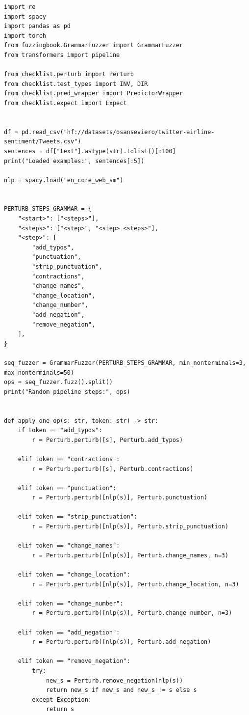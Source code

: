 \documentclass[11pt]{article}
\begin{document}
\lstset{style=mypython}
\begin{lstlisting}
import re
import spacy
import pandas as pd
import torch
from fuzzingbook.GrammarFuzzer import GrammarFuzzer
from transformers import pipeline

from checklist.perturb import Perturb
from checklist.test_types import INV, DIR
from checklist.pred_wrapper import PredictorWrapper
from checklist.expect import Expect


df = pd.read_csv("hf://datasets/osanseviero/twitter-airline-sentiment/Tweets.csv")
sentences = df["text"].astype(str).tolist()[:100]
print("Loaded examples:", sentences[:5])

nlp = spacy.load("en_core_web_sm")


PERTURB_STEPS_GRAMMAR = {
    "<start>": ["<steps>"],
    "<steps>": ["<step>", "<step> <steps>"],
    "<step>": [
        "add_typos",
        "punctuation",
        "strip_punctuation",
        "contractions",
        "change_names",
        "change_location",
        "change_number",
        "add_negation",
        "remove_negation",
    ],
}

seq_fuzzer = GrammarFuzzer(PERTURB_STEPS_GRAMMAR, min_nonterminals=3, max_nonterminals=50)
ops = seq_fuzzer.fuzz().split()
print("Random pipeline steps:", ops)


def apply_one_op(s: str, token: str) -> str:
    if token == "add_typos":
        r = Perturb.perturb([s], Perturb.add_typos)

    elif token == "contractions":
        r = Perturb.perturb([s], Perturb.contractions)

    elif token == "punctuation":
        r = Perturb.perturb([nlp(s)], Perturb.punctuation)

    elif token == "strip_punctuation":
        r = Perturb.perturb([nlp(s)], Perturb.strip_punctuation)

    elif token == "change_names":
        r = Perturb.perturb([nlp(s)], Perturb.change_names, n=3)

    elif token == "change_location":
        r = Perturb.perturb([nlp(s)], Perturb.change_location, n=3)

    elif token == "change_number":
        r = Perturb.perturb([nlp(s)], Perturb.change_number, n=3)

    elif token == "add_negation":
        r = Perturb.perturb([nlp(s)], Perturb.add_negation)

    elif token == "remove_negation":
        try:
            new_s = Perturb.remove_negation(nlp(s))
            return new_s if new_s and new_s != s else s
        except Exception:
            return s


\end{lstlisting}
\end{document}
